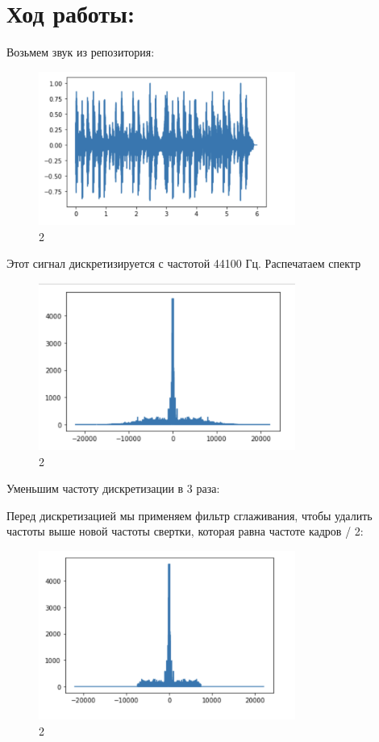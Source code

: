 \documentclass[10pt,a4paper,oneside]{article}
\begin{document}
\section{Ход работы:}

Возьмем звук из репозитория:

\begin{figure}[H]
        \centering
        \includegraphics[width=0.75\textwidth]{pics/1.png}
        \caption{2}
        \label{fig:first}
\end{figure}

Этот сигнал дискретизируется с частотой 44100 Гц. Распечатаем спектр

\begin{figure}[H]
        \centering
        \includegraphics[width=0.75\textwidth]{pics/2.png}
        \caption{2}
        \label{fig:first}
\end{figure}

Уменьшим частоту дискретизации в 3 раза:

Перед дискретизацией мы применяем фильтр сглаживания, чтобы удалить частоты выше новой частоты свертки, которая равна частоте кадров / 2:

\begin{figure}[H]
        \centering
        \includegraphics[width=0.75\textwidth]{pics/3.png}
        \caption{2}
        \label{fig:first}
\end{figure}
\end{document}
